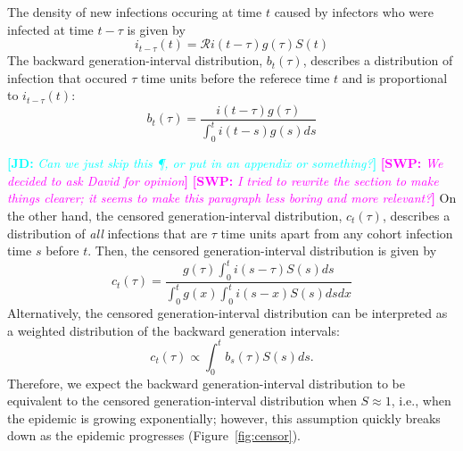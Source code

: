 \documentclass[12pt]{article}
\newcommand{\RR}{\ensuremath{{\mathcal R}}}
\newcommand{\comment}[3]{\textcolor{#1}{\textbf{[#2: }\textsl{#3}\textbf{]}}}
\newcommand{\jd}[1]{\comment{cyan}{JD}{#1}}
\newcommand{\swp}[1]{\comment{magenta}{SWP}{#1}}
\begin{document}
The density of new infections occuring at time $t$ caused by infectors who were infected at time $t-\tau$ is given by
\begin{equation}
i_{t-\tau}(t) = \RR i(t-\tau) g(\tau) S(t)
\end{equation}
The backward generation-interval distribution, $b_t(\tau)$, describes a distribution of infection that occured $\tau$ time units before the referece time $t$ and is proportional to $i_{t-\tau}(t)$:
\begin{equation}
b_t(\tau) = \frac{i(t-\tau) g(\tau)}{\int_0^t i(t-s) g(s) ds}
\end{equation}

\jd{Can we just skip this \P, or put in an appendix or something?}
\swp{We decided to ask David for opinion}
\swp{I tried to rewrite the section to make things clearer; it seems to make this paragraph less boring and more relevant?}
On the other hand, the censored generation-interval distribution, $c_t(\tau)$, describes a distribution of \emph{all} infections that are $\tau$ time units apart from any cohort infection time $s$ before $t$.
Then, the censored generation-interval distribution is given by
\begin{equation}\label{eq:obsg}
c_t(\tau) = \frac{g(\tau) \int_0^t i(s-\tau) S(s) ds}{\int_0^t g(x) \int_0^t i(s-x) S(s) ds dx}
\end{equation}
Alternatively, the censored generation-interval distribution can be interpreted as a weighted distribution of the backward generation intervals:
\begin{equation}
c_t(\tau) \propto \int_0^t b_s(\tau) S(s) ds.
\end{equation}
Therefore, we expect the backward generation-interval distribution to be equivalent to the censored generation-interval distribution when $S \approx 1$, i.e., when the epidemic is growing exponentially;
however, this assumption quickly breaks down as the epidemic progresses (Figure~\ref{fig:censor}).
\end{document}
